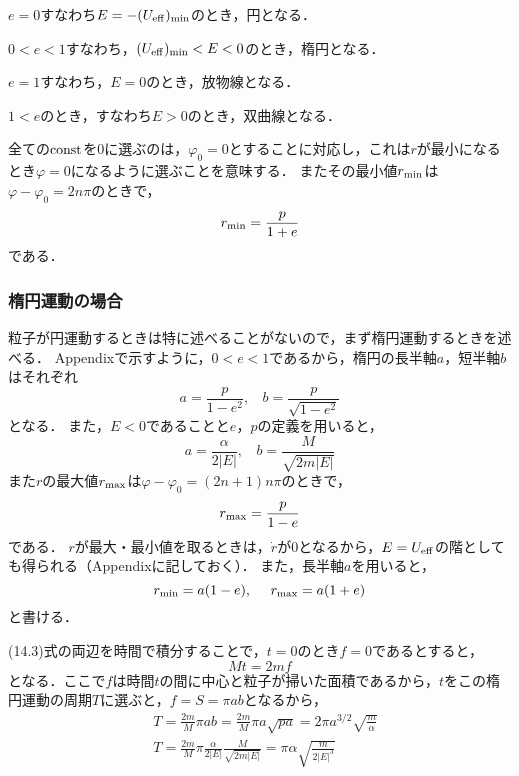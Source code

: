 \documentclass[12pt]{jsarticle}
\begin{document}
	$e=0$すなわち$E=-(U_{\rm eff})_{\rm min}$のとき，円となる．
	
	$0<e<1$すなわち，$(U_{\rm eff})_{\rm min} < E < 0$のとき，楕円となる．
	
	$e=1$すなわち，$E=0$のとき，放物線となる．
	
	$1<e$のとき，すなわち$E>0$のとき，双曲線となる．
	
	全ての${\rm const}$を$0$に選ぶのは，$\varphi_0 = 0$とすることに対応し，これは$r$が最小になるとき$\varphi=0$になるように選ぶことを意味する．
	またその最小値$r_{\rm min}$は$\varphi-\varphi_0=2n\pi$のときで，
	\[
	r_{\rm min} = \frac{p}{1+e}
	\]
	である．
	
	\subsubsection{楕円運動の場合}
	粒子が円運動するときは特に述べることがないので，まず楕円運動するときを述べる．
	Appendixで示すように，$0<e<1$であるから，楕円の長半軸$a$，短半軸$b$はそれぞれ
	\[
	a = \frac{p}{1-e^2}, \ \ \ \ b = \frac{p}{\sqrt{1-e^2}}
	\]
	となる．
	また，$E<0$であることと$e$，$p$の定義を用いると，
	\[
	a = \frac{\alpha}{2|E|}, \ \ \ \ b = \frac{M}{\sqrt{2m|E|}}
	\]
	また$r$の最大値$r_{\rm max}$は$\varphi-\varphi_0=(2n+1)n\pi$のときで，
	\[
	r_{\rm max} = \frac{p}{1-e}
	\]
	である．
	$r$が最大・最小値を取るときは，$\dot{r}$が$0$となるから，$E=U_{\rm eff}$の階としても得られる（Appendixに記しておく）．
	また，長半軸$a$を用いると，
	\[
	r_{\rm min} = a(1-e), \ \ \ \ r_{\rm max} = a(1+e)
	\]
	と書ける．
	
	(14.3)式の両辺を時間で積分することで，$t=0$のとき$f=0$であるとすると，
	\[
	Mt = 2mf
	\]
	となる．ここで$f$は時間$t$の間に中心と粒子が掃いた面積であるから，$t$をこの楕円運動の周期$T$に選ぶと，$f=S=\pi ab$となるから，
	\begin{align*}
	&T = \frac{2m}{M} \pi ab = \frac{2m}{M} \pi a \sqrt{pa}
	= 2\pi a^{3/2} \sqrt{\frac{m}{\alpha}} \\
	&T = \frac{2m}{M} \pi \frac{\alpha}{2|E|} \frac{M}{\sqrt{2m|E|}}
	= \pi \alpha \sqrt{\frac{m}{2|E|^3}}
	\end{align*}
	
\end{document}
